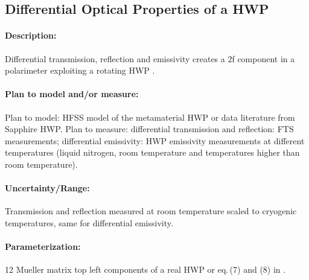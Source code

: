 \subsection{Differential Optical Properties of a HWP}

\paragraph{Description:}
Differential transmission, reflection and emissivity creates a $2$f component in a polarimeter exploiting a rotating HWP
\cite{Salatino10}.

\paragraph{Plan to model and/or measure:}
Plan to model: HFSS model of the metamaterial HWP or data literature from Sapphire HWP.
Plan to measure:
differential transmission and reflection: FTS measurements;
differential emissivity: HWP emissivity measurements at different temperatures
(liquid nitrogen, room temperature and temperatures higher than room temperature).

\paragraph{Uncertainty/Range:}
Transmission and reflection measured at room temperature scaled to cryogenic temperatures, same for differential emissivity.

\paragraph{Parameterization:}
12 Mueller matrix top left components of a real HWP or eq.$\,$(7) and (8) in \cite{Salatino16}.